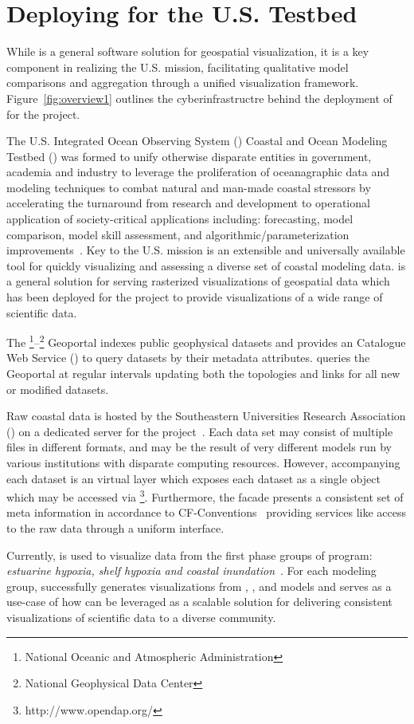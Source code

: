 \section{Deploying \sciwms{} for the U.S. \ioos{} \comt{} Testbed}
While \sciwms{} is a general software solution for geospatial
visualization, it is a key component in realizing the U.S. \ioos{}
\comt{} mission, facilitating qualitative model comparisons and
aggregation through a unified visualization
framework. Figure~\ref{fig:overview1} outlines the cyberinfrastructre
behind the deployment of \sciwms{} for the \comt{} project.

The U.S. Integrated Ocean Observing System (\ioos{}) Coastal and Ocean
Modeling Testbed (\comt{}) was formed to unify otherwise disparate
entities in government, academia and industry to leverage the
proliferation of oceanagraphic data and modeling techniques to combat
natural and man-made coastal stressors by accelerating the turnaround
from research and development to operational application of
society-critical applications including: forecasting, model
comparison, model skill assessment, and algorithmic/parameterization
improvements~\cite{luettich13}. Key to the U.S. \ioos{} \comt{}
mission is an extensible and universally available tool for quickly
visualizing and assessing a diverse set of coastal modeling
data. \sciwms{} is a general \ogc{} \wms{} solution for serving
rasterized visualizations of geospatial data which has been deployed
for the \comt{} project to provide visualizations of a wide range of
scientific data.

The \noaa{}\footnote{National Oceanic and Atmospheric
  Administration}--\ngdc{}\footnote{National Geophysical Data Center}
Geoportal indexes public geophysical datasets and provides an \ogc{}
Catalogue Web Service (\csw{}) to query datasets by their metadata
attributes. \sciwms{} queries the \ngdc{} Geoportal at regular intervals
updating both the topologies and \opendap{} links for all new or
modified datasets.

Raw coastal data is hosted by the Southeastern Universities Research
Association (\sura{}) on a dedicated server for the \comt{}
project~\cite{luettich12}. Each data set may consist of multiple files
in different formats, and may be the result of very different models
run by various institutions with disparate computing
resources. However, accompanying each dataset is an \ncml{} virtual
layer which exposes each dataset as a single \netcdf{} object which
may be accessed via
\opendap{}\footnote{http://www.opendap.org/}. Furthermore, the \ncml{}
facade presents a consistent set of meta information in accordance to
CF-Conventions~\cite{cf} providing services like \sciwms{} access to
the raw data through a uniform interface.

Currently, \Sciwms{} is used to visualize data from the first phase
groups of \ioos{} \comt{} program: {\em estuarine hypoxia, shelf hypoxia and
  coastal inundation}~\cite{luettich13}. For each modeling group,
\sciwms{} successfully generates visualizations from \adcirc{},
\fvcom{}, \selfe{} and \slosh{} models and serves as a use-case of how
\sciwms{} can be leveraged as a scalable solution for delivering
consistent visualizations of scientific data to a diverse community.
